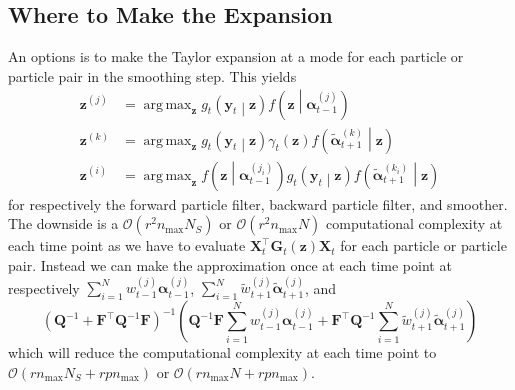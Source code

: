 \documentclass[notitlepage]{article}
\DeclareMathOperator*{\argmax}{arg\,max}
\renewcommand{\vec}[1]{\bm{#1}}
\newcommand{\mat}[1]{\mathbf{#1}}
\newcommand{\Lparen}[1]{\left( #1\right)}
\newcommand{\Cond}[2]{ #1 \middle\vert  #2}
\newcommand{\optor}[2]{#1\Lparen{#2}}
\newcommand{\optorC}[3]{\optor{#1}{\Cond{#2}{#3}}}
\newcommand{\gFunc}[3]{\optorC{g_{#3}}{#1}{#2}}
\newcommand{\fFunc}[2]{\optorC{f}{#1}{#2}}
\newcommand{\partic}[3]{#1_{#2}^{\Lparen{#3}}}
\newcommand{\particB}[3]{\widetilde{#1}_{#2}^{\Lparen{#3}}}
\newcommand{\bigO}[1]{\mathcal{O}\Lparen{#1}}
\newcommand{\dimState}{p}
\newcommand{\dimRng}{r}
\newcommand{\nPart}{N}
\newcommand{\nMax}{n_{\text{max}}}
\begin{document}
\subsection{Where to Make the Expansion}
An options is to make the Taylor expansion at a mode for each particle or particle pair in the smoothing step. This yields%
%
\begin{align*}
\vec z^{(j)} &= \argmax_{\vec z }
	\optorC{g_t}{\vec{y}_t}{\vec z}
	\optorC{f}{\vec z}{\partic{\vec\alpha}{t-1}j} \\
\vec z^{(k)} &= \argmax_{\vec z }
	\optorC{g_t}{\vec{y}_t}{\vec z}
	\gamma_t(\vec{z})
	\optorC{f}{\particB{\vec{\alpha}}{t + 1}k}{\vec z}\\
\vec z^{(i)} &= \argmax_{\vec z }
	\fFunc{\vec z}{\partic{\vec{\alpha}}{t - 1}{j_i}}
 	\gFunc{\vec{y}_t}{\vec z}{t}
 	\fFunc{\particB{\vec{\alpha}}{t + 1}{k_i}}{\vec z}
\end{align*}%
% 
for respectively the forward particle filter, backward particle filter, and smoother.
The downside is a $\bigO{\dimRng^2\nMax\nPart_S}$ or $\bigO{\dimRng^2\nMax\nPart}$ 
computational complexity at each time point 
as we have to evaluate $\mat X_t^\top \mat G_t(\vec z) \mat X_t$
for each particle or particle pair. Instead we can make the approximation 
once at each time point at 
respectively $\sum_{i=1}^\nPart \partic w{t-1}j\partic{\vec\alpha}{t-1}j$, %
$\sum_{i=1}^\nPart \particB w{t+1}j\particB{\vec\alpha}{t+1}j$, and %
%
$$
\Lparen{\mat Q^{-1} + \mat F^\top \mat Q^{-1}\mat F}^{-1}
\Lparen{\mat Q^{-1}\mat F\sum_{i=1}^\nPart \partic w{t-1}j\partic{\vec\alpha}{t-1}j + 
	\mat F^\top\mat Q^{-1}\sum_{i=1}^\nPart \particB w{t+1}j\particB{\vec\alpha}{t+1}j}
$$%
% 
which will reduce the computational complexity  at each time point to %
$\bigO{\dimRng\nMax\nPart_S + \dimRng\dimState\nMax}$ %
or $\bigO{\dimRng\nMax\nPart  + \dimRng\dimState\nMax}$. 
\end{document}
